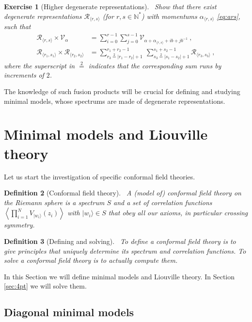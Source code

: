 \documentclass[12pt, a4paper]{article}
\theoremstyle{break}
\newtheorem{exo}{Exercise}[section]
\newtheorem{defn}[exo]{Definition}
\begin{document}
\begin{exo}[Higher degenerate representations]
~\label{exo:hdr}
 Show that there exist degenerate representations $\mathcal{R}_{\langle r,s \rangle}$ (for $r, s \in \mathbb{N}^*$) with momentums $\alpha_{\langle r,s \rangle}$ \eqref{eq:ars},
such that 
 \begin{align}
 \mathcal{R}_{\langle r,s \rangle}\times \mathcal{V}_\alpha &= \sum_{i=0}^{r-1} \sum_{j=0}^{s-1} \mathcal{V}_{\alpha + \alpha_{\langle r,s \rangle}+ ib+jb^{-1}}\ ,
\label{rtv}
 \\
 \mathcal{R}_{\langle r_1,s_1 \rangle} \times \mathcal{R}_{\langle r_2,s_2 \rangle} &= \sum_{r_3\overset{2}{=}|r_1-r_2|+1}^{r_1+r_2-1}\ \sum_{s_3\overset{2}{=}|s_1-s_2|+1}^{s_1+s_2-1} \mathcal{R}_{\langle r_3,s_3 \rangle}\ ,
\label{rrsr}
\end{align}
where the superscript in $\overset{2}{=}$ indicates that the corresponding sum runs by increments of $2$. 
\end{exo}
The knowledge of such fusion products will be crucial for defining and studying minimal models, whose spectrums are made of degenerate representations. 

\section{Minimal models and Liouville theory}

Let us start the investigation of specific conformal field theories. 

\begin{defn}[Conformal field theory]
~\label{def:cft}
A (model of) conformal field theory on the Riemann sphere is a spectrum $S$ and a set of correlation functions $\left<\prod_{i=1}^N V_{|w_i\rangle}(z_i)\right>$ with $|w_i\rangle\in S$ that obey all our axioms, in particular crossing symmetry. 
\end{defn}

\begin{defn}[Defining and solving]
 ~\label{def:def}
 To define a conformal field theory is to give principles that uniquely determine its spectrum and correlation functions.
 To solve a conformal field theory is to actually compute them.
\end{defn}
In this Section we will define minimal models and Liouville theory. In Section \ref{sec:4pt} we will solve them.


\subsection{Diagonal minimal models}
\end{document}
